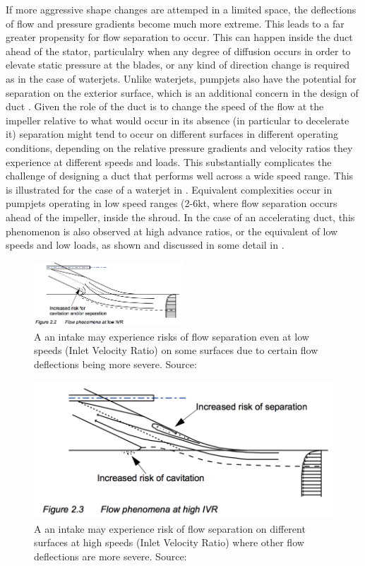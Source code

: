 \documentclass{article}\usepackage[]{graphicx}\usepackage[]{color}
\begin{document}
If more aggressive shape changes are attemped in a limited space, the deflections of flow and pressure gradients become much more extreme. This leads to a far greater propensity for flow separation to occur.  This can happen inside the duct ahead of the stator, particulalry when any degree of diffusion occurs in order to elevate static pressure at the blades, or any kind of direction change is required as in the case of waterjets. Unlike waterjets, pumpjets also have the potential for separation on the exterior surface, which is an additional concern in the design of duct \cite[13]{henderson1964}.  Given the role of the duct is to change the speed of the flow at the impeller relative to what would occur in its absence (in particular to decelerate it) separation might tend to occur on different surfaces in different operating conditions, depending on the relative pressure gradients and velocity ratios they experience at different speeds and loads.  This substantially complicates the challenge of designing a duct that performs well across a wide speed range. This is illustrated for the case of a waterjet in \cite[20]{bulten2006numerical}.  Equivalent complexities occur in pumpjets operating in low speed ranges (2-6kt, where flow separation occurs ahead of the impeller, inside the shroud.  In the case of an accelerating duct, this phenomenon is also observed at high advance ratios, or the equivalent of low speeds and low loads, as shown and discussed in some detail in \cite{willemsen2013}.

\begin{figure}
\includegraphics[width=0.5\textwidth]{LowIVR.png}
\caption{A an intake may experience risks of flow separation even at low speeds (Inlet Velocity Ratio) on some surfaces due to certain flow deflections being more severe. Source: \cite{bulten2006numerical}}
\label{fig:LowIVR.png}
\end{figure}

\begin{figure}
\includegraphics[width=\textwidth]{HighIVR.png}
\caption{A an intake may experience risk of flow separation on different surfaces at high speeds (Inlet Velocity Ratio) where other flow deflections are more severe. Source: \cite{bulten2006numerical}}
\label{fig:HighIVR.png}
\end{figure}
\end{document}
